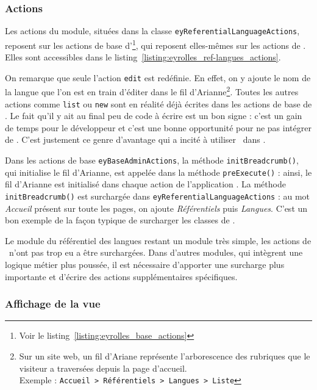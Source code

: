 \subsubsection{Actions}

Les actions du module, situées dans la classe \texttt{ey\-Referential\-Language\-Actions}, reposent sur les actions de base d'\aey\footnote{Voir le listing~\ref{listing:eyrolles_base_actions}}, qui reposent elles-mêmes sur les actions de \asladmin. Elles sont accessibles dans le listing~\ref{listing:eyrolles_ref-langues_actions}.

On remarque que seule l'action \texttt{edit} est redéfinie. En effet, on y ajoute le nom de la langue que l'on est en train d'éditer dans le fil d'Arianne\footnote{Sur un site web, un fil d'Ariane représente l'arborescence des rubriques que le visiteur a traversées depuis la page d'accueil.\cite{breadcrumb}\\Exemple : \texttt{Accueil > Référentiels > Langues > Liste}}. Toutes les autres actions comme \texttt{list} ou \texttt{new} sont en réalité déjà écrites dans les actions de base de \asladmin. Le fait qu'il y ait au final peu de code à écrire est un bon signe : c'est un gain de temps pour le développeur et c'est une bonne opportunité pour ne pas intégrer de \abug. C'est justement ce genre d'avantage qui a incité à utiliser \asladmin\ dans \aey.

Dans les actions de base \texttt{eyBaseAdminActions}, la méthode \texttt{init\-Bread\-crumb()}, qui initialise le fil d'Arianne, est appelée dans la méthode \texttt{pre\-Execute()} : ainsi, le fil d'Arianne est initialisé dans chaque action de l'application \aey. La méthode \texttt{initBreadcrumb()} est surchargée dans \texttt{ey\-Referential\-Language\-Actions} : au mot \textit{Accueil} présent sur toute les pages, on ajoute \textit{Référentiels} puis \textit{Langues}. C'est un bon exemple de la façon typique de surcharger les classes de \asladmin.

Le module du référentiel des langues restant un module très simple, les actions de \asladmin\ n'ont pas trop eu a être surchargées. Dans d'autres modules, qui intègrent une logique métier plus poussée, il est nécessaire d'apporter une surcharge plus importante et d'écrire des actions supplémentaires spécifiques.


\subsubsection{Affichage de la vue}

